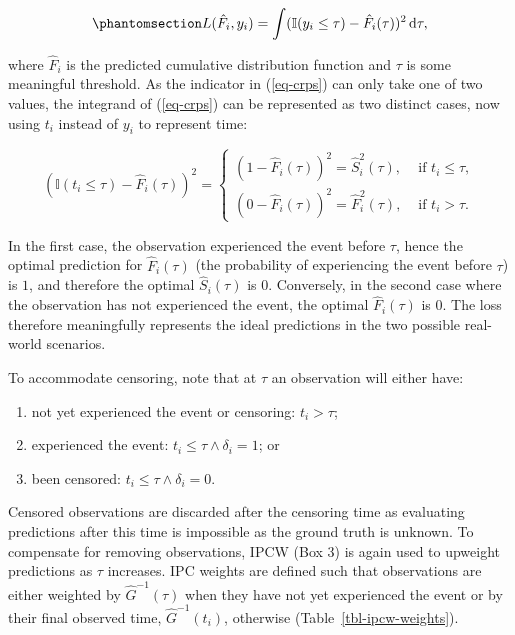\documentclass[
  letterpaper,
  krantz2]{style/krantz}
\providecommand{\tightlist}{%
  \setlength{\itemsep}{0pt}\setlength{\parskip}{0pt}}
\begin{document}
\begin{equation}\phantomsection\label{eq-crps}{
L(\hat{F}_i, y_i) = \int (\mathbb{I}(y_i \leq \tau) - \hat{F}_i(\tau))^2 \,\mathrm{d}\tau,
}\end{equation}

where \(\hat{F}_i\) is the predicted cumulative distribution function
and \(\tau\) is some meaningful threshold. As the indicator in
(\ref{eq-crps}) can only take one of two values, the integrand of
(\ref{eq-crps}) can be represented as two distinct cases, now using
\(t_i\) instead of \(y_i\) to represent time:

\[
(\mathbb{I}(t_i \leq \tau) - \hat{F}_i(\tau))^2 =
\begin{cases}
(1 - \hat{F}_i(\tau))^2 = \hat{S}_i^2(\tau), & \text{ if } t_i \leq \tau, \\
(0 - \hat{F}_i(\tau))^2 = \hat{F}_i^2(\tau), & \text{ if } t_i > \tau.
\end{cases}
\]

In the first case, the observation experienced the event before
\(\tau\), hence the optimal prediction for \(\hat{F}_i(\tau)\) (the
probability of experiencing the event before \(\tau\)) is \(1\), and
therefore the optimal \(\hat{S}_i(\tau)\) is \(0\). Conversely, in the
second case where the observation has not experienced the event, the
optimal \(\hat{F}_i(\tau)\) is \(0\). The loss therefore meaningfully
represents the ideal predictions in the two possible real-world
scenarios.

To accommodate censoring, note that at \(\tau\) an observation will
either have:

\begin{enumerate}
\def\labelenumi{\arabic{enumi}.}
\tightlist
\item
  not yet experienced the event or censoring: \(t_i > \tau\);
\item
  experienced the event: \(t_i \leq \tau \wedge \delta_i = 1\); or
\item
  been censored: \(t_i \leq \tau \wedge \delta_i = 0\).
\end{enumerate}

Censored observations are discarded after the censoring time as
evaluating predictions after this time is impossible as the ground truth
is unknown. To compensate for removing observations,
IPCW (Box 3) is again
used to upweight predictions as \(\tau\) increases. IPC weights are
defined such that observations are either weighted by
\(\hat{G}^{-1}(\tau)\) when they have not yet experienced the event or
by their final observed time, \(\hat{G}^{-1}(t_i)\), otherwise
(Table~\ref{tbl-ipcw-weights}).
\end{document}
